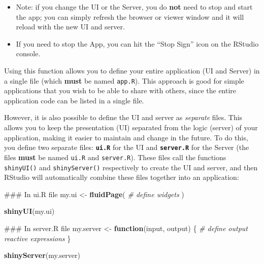 \documentclass[]{book}
\newenvironment{Shaded}{\begin{snugshade}}{\end{snugshade}}
\newcommand{\KeywordTok}[1]{\textcolor[rgb]{0.13,0.29,0.53}{\textbf{#1}}}
\newcommand{\StringTok}[1]{\textcolor[rgb]{0.31,0.60,0.02}{#1}}
\newcommand{\CommentTok}[1]{\textcolor[rgb]{0.56,0.35,0.01}{\textit{#1}}}
\newcommand{\ControlFlowTok}[1]{\textcolor[rgb]{0.13,0.29,0.53}{\textbf{#1}}}
\newcommand{\NormalTok}[1]{#1}
\theoremstyle{definition}
\theoremstyle{definition}
\theoremstyle{remark}
\begin{document}
\begin{itemize}
\item
  Note: if you change the UI or the Server, you do \textbf{not} need to
  stop and start the app; you can simply refresh the browser or viewer
  window and it will reload with the new UI and server.
\item
  If you need to stop the App, you can hit the ``Stop Sign'' icon on the
  RStudio console.
\end{itemize}

Using this function allows you to define your entire application (UI and
Server) in a single file (which \textbf{must} be named \texttt{app.R}).
This approach is good for simple applications that you wish to be able
to share with others, since the entire application code can be listed in
a single file.

However, it is also possible to define the UI and server as
\emph{separate} files. This allows you to keep the presentation (UI)
separated from the logic (server) of your application, making it easier
to maintain and change in the future. To do this, you define two
separate files: \textbf{\texttt{ui.R}} for the UI and
\textbf{\texttt{server.R}} for the Server (the files \textbf{must} be
named \texttt{ui.R} and \texttt{server.R}). These files call the
functions \texttt{shinyUI()} and \texttt{shinyServer()} respectively to
create the UI and server, and then RStudio will automatically combine
these files together into an application:

\begin{Shaded}
\begin{Highlighting}[]
\NormalTok{### In ui.R file}
\NormalTok{my.ui <-}\StringTok{ }\KeywordTok{fluidPage}\NormalTok{(}
  \CommentTok{# define widgets}
\NormalTok{)}

\KeywordTok{shinyUI}\NormalTok{(my.ui)}
\end{Highlighting}
\end{Shaded}

\begin{Shaded}
\begin{Highlighting}[]
\NormalTok{### In server.R file}
\NormalTok{my.server <-}\StringTok{ }\ControlFlowTok{function}\NormalTok{(input, output) \{}
  \CommentTok{# define output reactive expressions}
\NormalTok{\}}

\KeywordTok{shinyServer}\NormalTok{(my.server)}
\end{Highlighting}
\end{Shaded}
\end{document}
